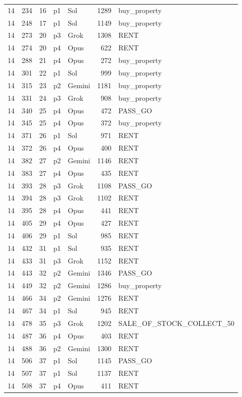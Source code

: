 \begin{longtable}{r r r l l r L{2.2in}}
14 & 234 & 16 & p1 & Sol & 1289 & buy\_property \\
14 & 248 & 17 & p1 & Sol & 1149 & buy\_property \\
14 & 273 & 20 & p3 & Grok & 1308 & RENT \\
14 & 274 & 20 & p4 & Opus & 622 & RENT \\
14 & 288 & 21 & p4 & Opus & 272 & buy\_property \\
14 & 301 & 22 & p1 & Sol & 999 & buy\_property \\
14 & 315 & 23 & p2 & Gemini & 1181 & buy\_property \\
14 & 331 & 24 & p3 & Grok & 908 & buy\_property \\
14 & 340 & 25 & p4 & Opus & 472 & PASS\_GO \\
14 & 345 & 25 & p4 & Opus & 372 & buy\_property \\
14 & 371 & 26 & p1 & Sol & 971 & RENT \\
14 & 372 & 26 & p4 & Opus & 400 & RENT \\
14 & 382 & 27 & p2 & Gemini & 1146 & RENT \\
14 & 383 & 27 & p4 & Opus & 435 & RENT \\
14 & 393 & 28 & p3 & Grok & 1108 & PASS\_GO \\
14 & 394 & 28 & p3 & Grok & 1102 & RENT \\
14 & 395 & 28 & p4 & Opus & 441 & RENT \\
14 & 405 & 29 & p4 & Opus & 427 & RENT \\
14 & 406 & 29 & p1 & Sol & 985 & RENT \\
14 & 432 & 31 & p1 & Sol & 935 & RENT \\
14 & 433 & 31 & p3 & Grok & 1152 & RENT \\
14 & 443 & 32 & p2 & Gemini & 1346 & PASS\_GO \\
14 & 449 & 32 & p2 & Gemini & 1286 & buy\_property \\
14 & 466 & 34 & p2 & Gemini & 1276 & RENT \\
14 & 467 & 34 & p1 & Sol & 945 & RENT \\
14 & 478 & 35 & p3 & Grok & 1202 & SALE\_OF\_STOCK\_COLLECT\_50 \\
14 & 487 & 36 & p4 & Opus & 403 & RENT \\
14 & 488 & 36 & p2 & Gemini & 1300 & RENT \\
14 & 506 & 37 & p1 & Sol & 1145 & PASS\_GO \\
14 & 507 & 37 & p1 & Sol & 1137 & RENT \\
14 & 508 & 37 & p4 & Opus & 411 & RENT \\

\end{longtable}

